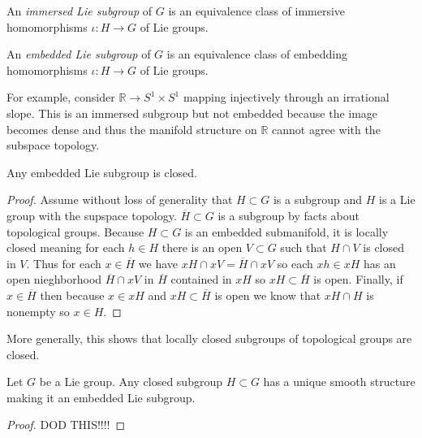 \documentclass[12pt]{article}
\newcommand{\R}{\mathbb{R}}
\begin{document}
\begin{defn}
An \textit{immersed Lie subgroup} of $G$ is an equivalence class of immersive homomorphisms $\iota : H \to G$ of Lie groups.
\end{defn}

\begin{defn}
An \textit{embedded Lie subgroup} of $G$ is an equivalence class of embedding homomorphisms $\iota : H \to G$ of Lie groups.
\end{defn}

\begin{rmk}
For example, consider $\R \to S^1 \times S^1$ mapping injectively through an irrational slope. This is an immersed subgroup but not embedded because the image becomes dense and thus the manifold structure on $\R$ cannot agree with the subspace topology.
\end{rmk}

\begin{prop}
Any embedded Lie subgroup is closed.
\end{prop}

\begin{proof}
Assume without loss of generality that $H \subset G$ is a subgroup and $H$ is a Lie group with the supspace topology. $\overline{H} \subset G$ is a subgroup by facts about topological groups. Because $H \subset G$ is an embedded submanifold, it is locally closed meaning for each $h \in H$ there is an open $V \subset G$ such that $H \cap V$ is closed in $V$. Thus for each $x \in \overline{H}$ we have $x H \cap x V = \overline{H} \cap x V$ so each $xh \in x H$ has an open nieghborhood $\overline{H} \cap x V$ in $\overline{H}$ contained in $x H$ so $x H \subset \overline{H}$ is open. Finally, if $x \in \overline{H}$ then because $x \in x H$ and $x H \subset \overline{H}$ is open we know that $x H \cap H$ is nonempty so $x \in H$.
\end{proof}

\begin{rmk}
More generally, this shows that locally closed subgroups of topological groups are closed.
\end{rmk}

\begin{theorem}[Cartan]
Let $G$ be a Lie group. Any closed subgroup $H \subset G$ has a unique smooth structure making it an embedded Lie subgroup.
\end{theorem}

\begin{proof}
DOD THIS!!!!
\end{proof}
\end{document}
